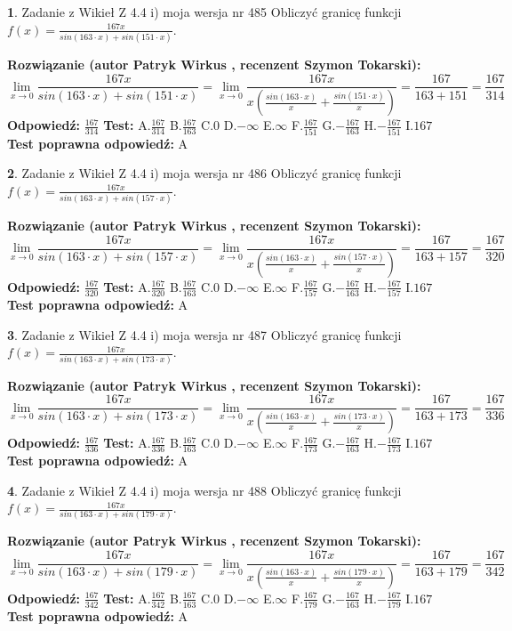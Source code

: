 \documentclass[12pt, a4paper]{article}
\theoremstyle{definition} %
\newtheorem{zad}{}
\newcommand{\zadStart}[1]{\begin{zad}#1\newline}
\newcommand{\zadStop}{\end{zad}}
\newcommand{\rozwStart}[2]{\noindent \textbf{Rozwiązanie (autor #1 , recenzent #2): }\newline}
\newcommand{\rozwStop}{\newline}
\newcommand{\odpStart}{\noindent \textbf{Odpowiedź:}\newline}
\newcommand{\odpStop}{\newline}
\newcommand{\testStart}{\noindent \textbf{Test:}\newline}
\newcommand{\testStop}{\newline}
\newcommand{\kluczStart}{\noindent \textbf{Test poprawna odpowiedź:}\newline}
\newcommand{\kluczStop}{\newline}
\begin{document}
\zadStart{Zadanie z Wikieł Z 4.4 i) moja wersja nr 485}
Obliczyć granicę funkcji $f(x)=\frac{167x}{sin(163\cdot x) +sin(151\cdot x)}$.
\zadStop
\rozwStart{Patryk Wirkus}{Szymon Tokarski}
$$\lim\limits_{x\to 0}\frac{167x}{sin(163\cdot x) +sin(151\cdot x)}=\lim\limits_{x\to 0}\frac{167x}{x(\frac{sin(163\cdot x)}{x}+\frac{sin(151\cdot x)}{x})}=\frac{167}{163+151} = \frac{167}{314}$$
\rozwStop
\odpStart
$\frac{167}{314}$
\odpStop
\testStart
A.$\frac{167}{314}$
B.$\frac{167}{163}$
C.$0$
D.$-\infty$
E.$\infty$
F.$\frac{167}{151}$
G.$-\frac{167}{163}$
H.$-\frac{167}{151}$
I.$167$
\testStop
\kluczStart
A
\kluczStop



\zadStart{Zadanie z Wikieł Z 4.4 i) moja wersja nr 486}
Obliczyć granicę funkcji $f(x)=\frac{167x}{sin(163\cdot x) +sin(157\cdot x)}$.
\zadStop
\rozwStart{Patryk Wirkus}{Szymon Tokarski}
$$\lim\limits_{x\to 0}\frac{167x}{sin(163\cdot x) +sin(157\cdot x)}=\lim\limits_{x\to 0}\frac{167x}{x(\frac{sin(163\cdot x)}{x}+\frac{sin(157\cdot x)}{x})}=\frac{167}{163+157} = \frac{167}{320}$$
\rozwStop
\odpStart
$\frac{167}{320}$
\odpStop
\testStart
A.$\frac{167}{320}$
B.$\frac{167}{163}$
C.$0$
D.$-\infty$
E.$\infty$
F.$\frac{167}{157}$
G.$-\frac{167}{163}$
H.$-\frac{167}{157}$
I.$167$
\testStop
\kluczStart
A
\kluczStop



\zadStart{Zadanie z Wikieł Z 4.4 i) moja wersja nr 487}
Obliczyć granicę funkcji $f(x)=\frac{167x}{sin(163\cdot x) +sin(173\cdot x)}$.
\zadStop
\rozwStart{Patryk Wirkus}{Szymon Tokarski}
$$\lim\limits_{x\to 0}\frac{167x}{sin(163\cdot x) +sin(173\cdot x)}=\lim\limits_{x\to 0}\frac{167x}{x(\frac{sin(163\cdot x)}{x}+\frac{sin(173\cdot x)}{x})}=\frac{167}{163+173} = \frac{167}{336}$$
\rozwStop
\odpStart
$\frac{167}{336}$
\odpStop
\testStart
A.$\frac{167}{336}$
B.$\frac{167}{163}$
C.$0$
D.$-\infty$
E.$\infty$
F.$\frac{167}{173}$
G.$-\frac{167}{163}$
H.$-\frac{167}{173}$
I.$167$
\testStop
\kluczStart
A
\kluczStop



\zadStart{Zadanie z Wikieł Z 4.4 i) moja wersja nr 488}
Obliczyć granicę funkcji $f(x)=\frac{167x}{sin(163\cdot x) +sin(179\cdot x)}$.
\zadStop
\rozwStart{Patryk Wirkus}{Szymon Tokarski}
$$\lim\limits_{x\to 0}\frac{167x}{sin(163\cdot x) +sin(179\cdot x)}=\lim\limits_{x\to 0}\frac{167x}{x(\frac{sin(163\cdot x)}{x}+\frac{sin(179\cdot x)}{x})}=\frac{167}{163+179} = \frac{167}{342}$$
\rozwStop
\odpStart
$\frac{167}{342}$
\odpStop
\testStart
A.$\frac{167}{342}$
B.$\frac{167}{163}$
C.$0$
D.$-\infty$
E.$\infty$
F.$\frac{167}{179}$
G.$-\frac{167}{163}$
H.$-\frac{167}{179}$
I.$167$
\testStop
\kluczStart
A
\kluczStop
\end{document}

